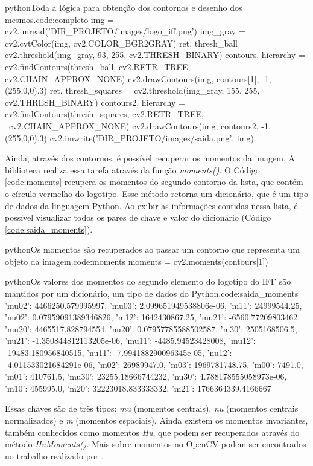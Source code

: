 \begin{code}{python}{Toda a lógica para obtenção dos contornos e desenho dos mesmos.}{code:completo}
img = cv2.imread('DIR_PROJETO/images/logo_iff.png')
img_gray = cv2.cvtColor(img, cv2.COLOR_BGR2GRAY)
ret, thresh_ball = cv2.threshold(img_gray, 93, 255, cv2.THRESH_BINARY)
contours, hierarchy = cv2.findContours(thresh_ball, cv2.RETR_TREE, cv2.CHAIN_APPROX_NONE)
cv2.drawContours(img, contours[1], -1, (255,0,0),3)
ret, thresh_squares = cv2.threshold(img_gray, 155, 255, cv2.THRESH_BINARY)
contours2, hierarchy = cv2.findContours(thresh_squares, cv2.RETR_TREE, \
	cv2.CHAIN_APPROX_NONE)
cv2.drawContours(img, contours2, -1, (255,0,0),3)
cv2.imwrite('DIR_PROJETO/images/saida.png', img)
\end{code}

Ainda, através dos contornos, é possível recuperar os momentos da imagem. A biblioteca realiza essa tarefa através da função \textit{moments()}. O Código \ref{code:moments} recupera os momentos do segundo contorno da lista, que contém o círculo vermelho do logotipo. Esse método retorna um dicionário, que é um tipo de dados da linguagem Python. Ao exibir as informações contidas nessa lista, é possível visualizar todos os pares de chave e valor do dicionário (Código \ref{code:saida_moments}).

\begin{code}{python}{Os momentos são recuperados ao passar um contorno que representa um objeto da imagem.}{code:moments}
moments = cv2.moments(contours[1])
\end{code}

\begin{code}{python}{Os valores dos momentos do segundo elemento do logotipo do IFF são mantidos por um dicionário, um tipo de dados do Python.}{code:saida_moments}
{'mu02': 4466250.579995997, 'mu03': 2.099651949538806e-06, 'm11': 24999544.25,
 'nu02': 0.07959091389346826, 'm12': 1642430867.25, 'mu21': -6560.77209803462,
 'mu20': 4465517.828794554, 'nu20': 0.07957785588502587, 'm30': 2505168506.5,
 'nu21': -1.350844812113205e-06, 'mu11': -4485.94523428008,
 'mu12': -19483.180956840515, 'nu11': -7.994188290096345e-05,
 'nu12': -4.011533021684291e-06, 'm02': 26989947.0, 'm03': 1969781748.75,
 'm00': 7491.0, 'm01': 410761.5, 'mu30': 23255.18666744232,
 'nu30': 4.788178555058973e-06, 'm10': 455995.0, 'm20': 32223018.833333332,
 'm21': 1766364339.4166667}
\end{code}

Essas chaves são de três tipos: \textit{mu} (momentos centrais), \textit{nu} (momentos centrais normalizados) e \textit{m} (momentos espaciais). Ainda existem os momentos invariantes, também conhecidos como momentos \textit{Hu}, que podem ser recuperados através do método \textit{HuMoments()}. Mais sobre momentos no OpenCV podem ser encontrados no trabalho realizado por .

